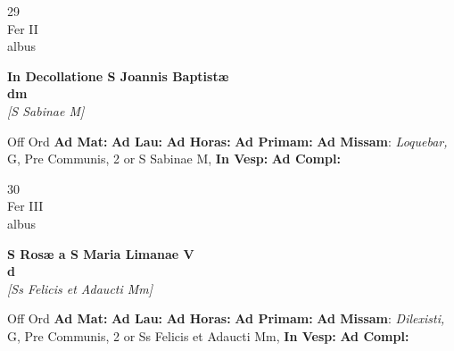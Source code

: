 \documentclass[10pt, openany]{book}
\begin{document}
        \begin{center}
            \begin{minipage}{3.5in}
                \vspace{2em}
                \begin{minipage}{0.5in}
                    {\Huge 29} \\
                    {\normalsize Fer II} \\
                    {\normalsize albus}
                \end{minipage}
                \begin{minipage}{3.0in}
                    \textbf{ \large In Decollatione S Joannis Baptistæ \\
                    \textnormal{\normalsize dm}} \\ \textit{[S Sabinae M]} \\ 
                \end{minipage}
                \begin{justify}Off Ord
                    \textbf{Ad Mat: }
                    \textbf{Ad Lau: }
                    \textbf{Ad Horas: }
                    \textbf{Ad Primam: }\textbf{Ad Missam}: \textit{Loquebar,} G, Pre Communis, 2 or S Sabinae M,  
                    \textbf{In Vesp: }
                    \textbf{Ad Compl: }
                \end{justify}
            \end{minipage}
        \end{center}
    
        \begin{center}
            \begin{minipage}{3.5in}
                \vspace{2em}
                \begin{minipage}{0.5in}
                    {\Huge 30} \\
                    {\normalsize Fer III} \\
                    {\normalsize albus}
                \end{minipage}
                \begin{minipage}{3.0in}
                    \textbf{ \large S Rosæ a S Maria Limanae V \\
                    \textnormal{\normalsize d}} \\ \textit{[Ss Felicis et Adaucti Mm]} \\ 
                \end{minipage}
                \begin{justify}Off Ord
                    \textbf{Ad Mat: }
                    \textbf{Ad Lau: }
                    \textbf{Ad Horas: }
                    \textbf{Ad Primam: }\textbf{Ad Missam}: \textit{Dilexisti,} G, Pre Communis, 2 or Ss Felicis et Adaucti Mm,  
                    \textbf{In Vesp: }
                    \textbf{Ad Compl: }
                \end{justify}
            \end{minipage}
        \end{center}
    
\end{document}
